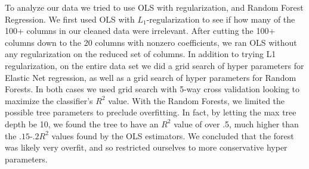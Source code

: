 \documentclass[11pt]{article}
\begin{document}
To analyze our data we tried to use OLS with regularization, and Random
Forest Regression. We first used OLS with \(L_1\)-regularization to see
if how many of the 100+ columns in our cleaned data were irrelevant.
After cutting the 100+ columns down to the 20 columns with nonzero
coefficients, we ran OLS without any regularization on the reduced set
of columns. In addition to trying L1 regularization, on the entire data
set we did a grid search of hyper parameters for Elastic Net regression,
as well as a grid search of hyper parameters for Random Forests. In both
cases we used grid search with 5-way cross validation looking to
maximize the classifier's \(R^2\) value. With the Random Forests, we
limited the possible tree parameters to preclude overfitting. In fact,
by letting the max tree depth be 10, we found the tree to have an
\(R^2\) value of over .5, much higher than the \(.15\)-\(.2 R^2\) values
found by the OLS estimators. We concluded that the forest was likely
very overfit, and so restricted ourselves to more conservative hyper
parameters. 
\newpage
\end{document}
